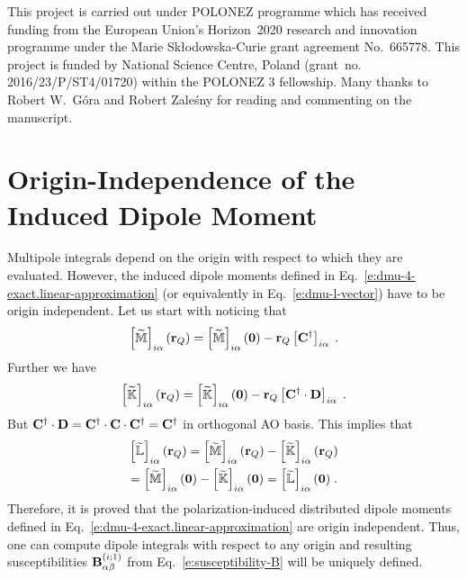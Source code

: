 \documentclass[aip,amsmath,amssymb,reprint,floatfix]{revtex4-1}
\begin{document}
\begin{acknowledgments}
This project is carried out under POLONEZ programme which has received funding from the European Union's
Horizon~2020 research and innovation programme under the Marie Skłodowska-Curie grant agreement 
No.~665778. This project is funded by National Science Centre, Poland 
(grant~no. 2016/23/P/ST4/01720) within the POLONEZ 3 fellowship.
Many thanks to Robert W.~G{\'o}ra and Robert Zale{\'s}ny 
for reading and commenting on the manuscript.
\end{acknowledgments}

%
\appendix

\section{\label{a:orig-dep} Origin-Independence of the Induced Dipole Moment}

Multipole integrals depend on the origin with respect to which they are evaluated.
However, the induced dipole moments defined in Eq.~\eqref{e:dmu-4-exact.linear-approximation} 
(or equivalently in Eq.~\eqref{e:dmu-l-vector})
have to be origin independent. 
Let us start with noticing that
%
\begin{equation}
 \left[ \widetilde{\mathbb{M}} \right]_{i\alpha} ({\bf r}_Q) 
 = \left[ \widetilde{\mathbb{M}} \right]_{i\alpha} ({\bf 0}) - {\bf r}_Q \left[ {\bf C}^\dagger \right]_{i\alpha}  \;.
\end{equation}
%
Further we have
%
\begin{equation}
 \left[ \widetilde{\mathbb{K}} \right]_{i\alpha} ({\bf r}_Q) 
 = \left[ \widetilde{\mathbb{K}} \right]_{i\alpha} ({\bf 0}) - {\bf r}_Q \left[ {\bf C}^\dagger \cdot {\bf D} \right]_{i\alpha} \;.
\end{equation}
%
But ${\bf C}^\dagger \cdot {\bf D}={\bf C}^\dagger \cdot {\bf C} \cdot {\bf C}^\dagger={\bf C}^\dagger$ in orthogonal
AO basis. This implies that
%
\begin{multline}
   \left[ \widetilde{\mathbb{L}} \right]_{i\alpha} ({\bf r}_Q) 
 = \left[ \widetilde{\mathbb{M}} \right]_{i\alpha} ({\bf r}_Q) 
 - \left[ \widetilde{\mathbb{K}} \right]_{i\alpha} ({\bf r}_Q) \\
 = \left[ \widetilde{\mathbb{M}} \right]_{i\alpha} ({\bf 0})   
 - \left[ \widetilde{\mathbb{K}} \right]_{i\alpha} ({\bf 0})
 = \left[ \widetilde{\mathbb{L}} \right]_{i\alpha} ({\bf 0}) \;.
\end{multline}
%
Therefore, it is proved that the polarization\hyp{}induced distributed dipole moments 
defined in Eq.~\eqref{e:dmu-4-exact.linear-approximation} 
are origin independent.
Thus, one can compute dipole integrals with respect to any origin and resulting
susceptibilities ${\bf B}_{\alpha\beta}^{(i;1)}$ from Eq.~\eqref{e:susceptibility-B} will be uniquely defined.
\end{document}
